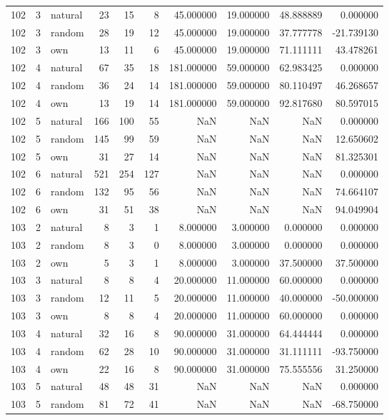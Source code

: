 \begin{table}[htbp]
\begin{tabular}{rrlrrrrrrr}
102 & 3 & natural & 23 & 15 & 8 & 45.000000 & 19.000000 & 48.888889 & 0.000000 \\
102 & 3 & random & 28 & 19 & 12 & 45.000000 & 19.000000 & 37.777778 & -21.739130 \\
102 & 3 & own & 13 & 11 & 6 & 45.000000 & 19.000000 & 71.111111 & 43.478261 \\
102 & 4 & natural & 67 & 35 & 18 & 181.000000 & 59.000000 & 62.983425 & 0.000000 \\
102 & 4 & random & 36 & 24 & 14 & 181.000000 & 59.000000 & 80.110497 & 46.268657 \\
102 & 4 & own & 13 & 19 & 14 & 181.000000 & 59.000000 & 92.817680 & 80.597015 \\
102 & 5 & natural & 166 & 100 & 55 & NaN & NaN & NaN & 0.000000 \\
102 & 5 & random & 145 & 99 & 59 & NaN & NaN & NaN & 12.650602 \\
102 & 5 & own & 31 & 27 & 14 & NaN & NaN & NaN & 81.325301 \\
102 & 6 & natural & 521 & 254 & 127 & NaN & NaN & NaN & 0.000000 \\
102 & 6 & random & 132 & 95 & 56 & NaN & NaN & NaN & 74.664107 \\
102 & 6 & own & 31 & 51 & 38 & NaN & NaN & NaN & 94.049904 \\
103 & 2 & natural & 8 & 3 & 1 & 8.000000 & 3.000000 & 0.000000 & 0.000000 \\
103 & 2 & random & 8 & 3 & 0 & 8.000000 & 3.000000 & 0.000000 & 0.000000 \\
103 & 2 & own & 5 & 3 & 1 & 8.000000 & 3.000000 & 37.500000 & 37.500000 \\
103 & 3 & natural & 8 & 8 & 4 & 20.000000 & 11.000000 & 60.000000 & 0.000000 \\
103 & 3 & random & 12 & 11 & 5 & 20.000000 & 11.000000 & 40.000000 & -50.000000 \\
103 & 3 & own & 8 & 8 & 4 & 20.000000 & 11.000000 & 60.000000 & 0.000000 \\
103 & 4 & natural & 32 & 16 & 8 & 90.000000 & 31.000000 & 64.444444 & 0.000000 \\
103 & 4 & random & 62 & 28 & 10 & 90.000000 & 31.000000 & 31.111111 & -93.750000 \\
103 & 4 & own & 22 & 16 & 8 & 90.000000 & 31.000000 & 75.555556 & 31.250000 \\
103 & 5 & natural & 48 & 48 & 31 & NaN & NaN & NaN & 0.000000 \\
103 & 5 & random & 81 & 72 & 41 & NaN & NaN & NaN & -68.750000 \\

\end{tabular}
\end{table}
